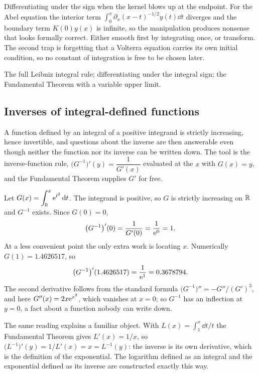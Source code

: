 \begin{trap}
Differentiating under the sign when the kernel blows up at the endpoint. For the Abel equation the interior term $\int_{0}^{x}\partial_{x}(x-t)^{-1/2}y(t)\dd t$ diverges and the boundary term $K(0)y(x)$ is infinite, so the manipulation produces nonsense that looks formally correct. Either smooth first by integrating once, or transform. The second trap is forgetting that a Volterra equation carries its own initial condition, so no constant of integration is free to be chosen later.
\end{trap}

\begin{seealsob}The full Leibniz integral rule; differentiating under the integral sign; the Fundamental Theorem with a variable upper limit.\end{seealsob}

\subsection{Inverses of integral-defined functions}

A function defined by an integral of a positive integrand is strictly increasing, hence invertible, and questions about the inverse are then answerable even though neither the function nor its inverse can be written down. The tool is the inverse-function rule, $\bigl(G^{-1}\bigr)'(y)=\dfrac{1}{G'(x)}$ evaluated at the $x$ with $G(x)=y$, and the Fundamental Theorem supplies $G'$ for free.

Let $G(x)=\displaystyle\int_{0}^{x}\mathrm{e}^{t^{2}}\,\mathrm{d} t$. The integrand is positive, so $G$ is strictly increasing on $\mathbb{R}$ and $G^{-1}$ exists. Since $G(0)=0$,
\[
\bigl(G^{-1}\bigr)'(0)=\frac{1}{G'(0)}=\frac{1}{\mathrm{e}^{0}}=1 .
\]
At a less convenient point the only extra work is locating $x$. Numerically $G(1)=1.4626517$, so
\[
\bigl(G^{-1}\bigr)'(1.4626517)=\frac{1}{\mathrm{e}^{1}}=0.3678794 .
\]
The second derivative follows from the standard formula $\bigl(G^{-1}\bigr)''=-G''/(G')^{3}$, and here $G''(x)=2x\mathrm{e}^{x^{2}}$, which vanishes at $x=0$; so $G^{-1}$ has an inflection at $y=0$, a fact about a function nobody can write down.

The same reading explains a familiar object. With $L(x)=\int_{1}^{x}\dd t/t$ the Fundamental Theorem gives $L'(x)=1/x$, so $\bigl(L^{-1}\bigr)'(y)=1/L'(x)=x=L^{-1}(y)$: the inverse is its own derivative, which is the definition of the exponential. The logarithm defined as an integral and the exponential defined as its inverse are constructed exactly this way.

